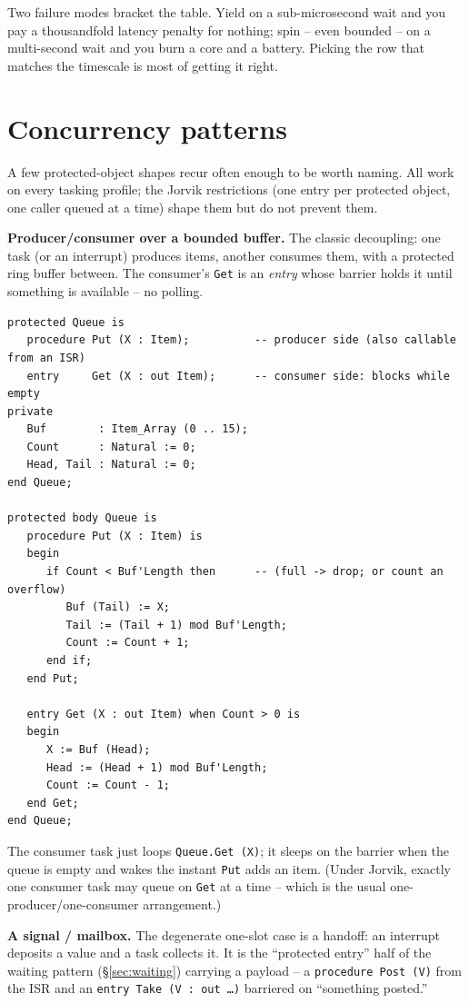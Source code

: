 Two failure modes bracket the table. Yield on a sub-microsecond wait and you pay a
thousandfold latency penalty for nothing; spin -- even bounded -- on a
multi-second wait and you burn a core and a battery. Picking the row that matches
the timescale is most of getting it right.

\section{Concurrency patterns}
\label{sec:concurrency}

A few protected-object shapes recur often enough to be worth naming. All work on
every tasking profile; the Jorvik restrictions (one entry per protected object,
one caller queued at a time) shape them but do not prevent them.

\textbf{Producer/consumer over a bounded buffer.} The classic decoupling: one
task (or an interrupt) produces items, another consumes them, with a protected
ring buffer between. The consumer's \texttt{Get} is an \emph{entry} whose barrier
holds it until something is available -- no polling.

\begin{lstlisting}
protected Queue is
   procedure Put (X : Item);          -- producer side (also callable from an ISR)
   entry     Get (X : out Item);      -- consumer side: blocks while empty
private
   Buf        : Item_Array (0 .. 15);
   Count      : Natural := 0;
   Head, Tail : Natural := 0;
end Queue;

protected body Queue is
   procedure Put (X : Item) is
   begin
      if Count < Buf'Length then      -- (full -> drop; or count an overflow)
         Buf (Tail) := X;
         Tail := (Tail + 1) mod Buf'Length;
         Count := Count + 1;
      end if;
   end Put;

   entry Get (X : out Item) when Count > 0 is
   begin
      X := Buf (Head);
      Head := (Head + 1) mod Buf'Length;
      Count := Count - 1;
   end Get;
end Queue;
\end{lstlisting}

The consumer task just loops \texttt{Queue.Get (X)}; it sleeps on the barrier when
the queue is empty and wakes the instant \texttt{Put} adds an item. (Under Jorvik,
exactly one consumer task may queue on \texttt{Get} at a time -- which is the
usual one-producer/one-consumer arrangement.)

\textbf{A signal / mailbox.} The degenerate one-slot case is a handoff: an
interrupt deposits a value and a task collects it. It is the
``protected entry'' half of the waiting pattern (\S\ref{sec:waiting}) carrying a
payload -- a \texttt{procedure Post (V)} from the ISR and an
\texttt{entry Take (V : out \ldots)} barriered on ``something posted.''

